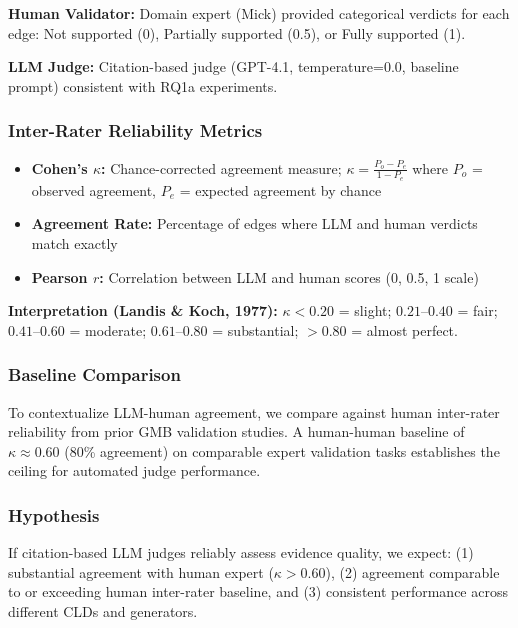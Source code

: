 \textbf{Human Validator:} Domain expert (Mick) provided categorical verdicts for each edge: Not supported (0), Partially supported (0.5), or Fully supported (1).

\textbf{LLM Judge:} Citation-based judge (GPT-4.1, temperature=0.0, baseline prompt) consistent with RQ1a experiments.

\subsubsection{Inter-Rater Reliability Metrics}

\begin{itemize}[noitemsep]
    \item \textbf{Cohen's $\kappa$:} Chance-corrected agreement measure; $\kappa = \frac{P_o - P_e}{1 - P_e}$ where $P_o$ = observed agreement, $P_e$ = expected agreement by chance
    \item \textbf{Agreement Rate:} Percentage of edges where LLM and human verdicts match exactly
    \item \textbf{Pearson $r$:} Correlation between LLM and human scores (0, 0.5, 1 scale)
\end{itemize}

\textbf{Interpretation (Landis \& Koch, 1977):} $\kappa < 0.20$ = slight; $0.21$--$0.40$ = fair; $0.41$--$0.60$ = moderate; $0.61$--$0.80$ = substantial; $> 0.80$ = almost perfect.

\subsubsection{Baseline Comparison}

To contextualize LLM-human agreement, we compare against human inter-rater reliability from prior GMB validation studies. A human-human baseline of $\kappa \approx 0.60$ (80\% agreement) on comparable expert validation tasks establishes the ceiling for automated judge performance.

\subsubsection{Hypothesis}

If citation-based LLM judges reliably assess evidence quality, we expect: (1) substantial agreement with human expert ($\kappa > 0.60$), (2) agreement comparable to or exceeding human inter-rater baseline, and (3) consistent performance across different CLDs and generators.

